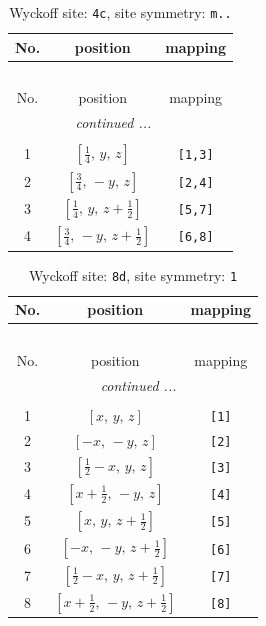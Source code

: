 \documentclass[fleqn,8pt]{jsarticle}
\begin{document}
\renewcommand{\arraystretch}{1.2}
\begin{longtable}{ccc}
\caption{Wyckoff site: {\tt 4c}, site symmetry: {\tt m..}}
 \\
 \hline \hline
No. & position & mapping \\ \hline \endfirsthead

\multicolumn{2}{l}{\tablename\ \thetable{}} \\
 \hline \hline
No. & position & mapping \\ \hline \endhead

 \hline \hline
\multicolumn{2}{r}{\footnotesize\it continued ...} \\ \endfoot

 \hline \hline
\multicolumn{2}{r}{} \\ \endlastfoot

1 & $\left[ \frac{1}{4},\, y,\, z \right]$ & {\tt [1,3]} \\ \hline
2 & $\left[ \frac{3}{4},\, - y,\, z \right]$ & {\tt [2,4]} \\ \hline
3 & $\left[ \frac{1}{4},\, y,\, z + \frac{1}{2} \right]$ & {\tt [5,7]} \\ \hline
4 & $\left[ \frac{3}{4},\, - y,\, z + \frac{1}{2} \right]$ & {\tt [6,8]} \\
\end{longtable}
\renewcommand{\arraystretch}{1.2}
\begin{longtable}{ccc}
\caption{Wyckoff site: {\tt 8d}, site symmetry: {\tt 1}}
 \\
 \hline \hline
No. & position & mapping \\ \hline \endfirsthead

\multicolumn{2}{l}{\tablename\ \thetable{}} \\
 \hline \hline
No. & position & mapping \\ \hline \endhead

 \hline \hline
\multicolumn{2}{r}{\footnotesize\it continued ...} \\ \endfoot

 \hline \hline
\multicolumn{2}{r}{} \\ \endlastfoot

1 & $\left[ x,\, y,\, z \right]$ & {\tt [1]} \\ \hline
2 & $\left[ - x,\, - y,\, z \right]$ & {\tt [2]} \\ \hline
3 & $\left[ \frac{1}{2} - x,\, y,\, z \right]$ & {\tt [3]} \\ \hline
4 & $\left[ x + \frac{1}{2},\, - y,\, z \right]$ & {\tt [4]} \\ \hline
5 & $\left[ x,\, y,\, z + \frac{1}{2} \right]$ & {\tt [5]} \\ \hline
6 & $\left[ - x,\, - y,\, z + \frac{1}{2} \right]$ & {\tt [6]} \\ \hline
7 & $\left[ \frac{1}{2} - x,\, y,\, z + \frac{1}{2} \right]$ & {\tt [7]} \\ \hline
8 & $\left[ x + \frac{1}{2},\, - y,\, z + \frac{1}{2} \right]$ & {\tt [8]} \\
\end{longtable}
\end{document}
